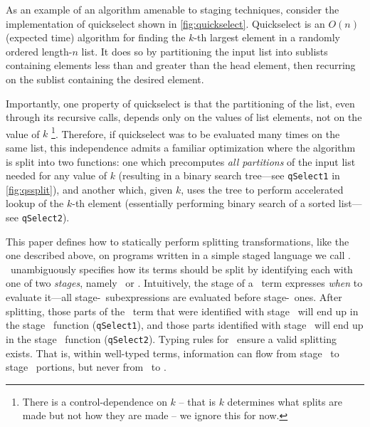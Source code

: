 As an example of an algorithm amenable to staging techniques,
consider the implementation of quickselect shown in \ref{fig:quickselect}.
Quickselect is an $O(n)$ (expected time) algorithm for finding the $k$-th largest element in a randomly ordered length-$n$ list.
It does so by partitioning the input list into sublists containing elements less than and greater than the head element, 
then recurring on the sublist containing the desired element.

Importantly, one property of quickselect is that the partitioning of the list, even through its recursive calls, depends only on the values of list elements, not on the value of $k$ 
\footnote{There is a control-dependence on $k$ -- that is $k$ determines what splits are made but not how they are made -- we ignore this for now.}.  Therefore, if quickselect was to be evaluated many times on the same list, this independence admits a familiar optimization where the algorithm is split into two functions: one which precomputes \emph{all partitions} of the input list needed for any value of $k$ (resulting in a binary search tree---see \texttt{qSelect1} in \ref{fig:qssplit}),
and another which, given $k$, uses the tree to perform accelerated lookup of the $k$-th element (essentially performing binary search of a sorted list---see \texttt{qSelect2}).

This paper defines how to statically perform splitting transformations, like the one described above, on programs written in a simple staged language we call \lang.  \lang\ unambiguously specifies how its terms should be split
by identifying each with one of two {\em stages}, namely \bbone\ or \bbtwo.
Intuitively, the stage of a \lang\ term expresses \emph{when} to evaluate it---all stage-\bbone\
subexpressions are evaluated before stage-\bbtwo\ ones.  
After splitting, those parts of the \lang\ term that were identified with stage \bbone\ 
will end up in the stage \bbone\ function ({\tt qSelect1}), 
and those parts identified with stage \bbtwo\ will end up in the stage \bbtwo\ function ({\tt qSelect2}).
Typing rules for \lang\ ensure a valid splitting exists.  That is, 
within well-typed terms, information can flow from stage \bbone\ to stage \bbtwo\ portions,
but never from \bbtwo\ to \bbone.

